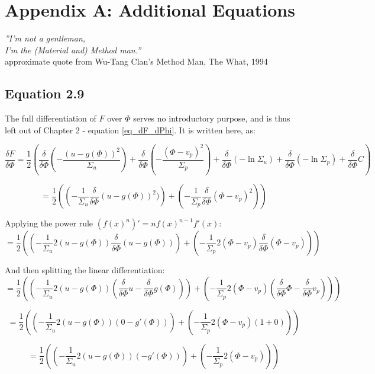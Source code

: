 \section{Appendix A: Additional Equations} 
\begin{flushright}
    \textit{''I'm not a gentleman,\\
    I'm the (Material and) Method man.''}\\
    approximate quote from Wu-Tang Clan's Method Man, The What, 1994
\end{flushright}
\label{appendix_maths}

\subsection{Equation 2.9}
The full differentiation of $F$ over $\Phi$ serves no introductory purpose, and is thus left out of Chapter 2 - equation \ref{eq_dF_dPhi}. It is written here, as: 

$$ \frac{\delta F}{\delta \Phi} = 
\frac{1}{2} \left(
\frac{\delta}{\delta \Phi}     \left(-\frac{(u - g(\Phi))^2}{\Sigma_u}\right) +
\frac{\delta}{\delta \Phi}     \left(-\frac{(\Phi - v_p)^2}{\Sigma_p}\right) + 
\frac{\delta}{\delta \Phi}      \left( -\ln\Sigma_u \right) + 
\frac{\delta}{\delta \Phi}      \left( -\ln\Sigma_p \right) + 
\frac{\delta}{\delta \Phi}      C
\right)
$$

$$ = 
\frac{1}{2} \left(
\left( -\frac{1}{\Sigma_u} \frac{\delta}{\delta \Phi} (u-g(\Phi))^2) \right) +
\left( -\frac{1}{\Sigma_p} \frac{\delta}{\delta \Phi} (\Phi-v_p)^2 \right)
\right)
$$

Applying the power rule $(f(x)^n)' = n f(x)^{n-1} f'(x)$:
$$ = 
\frac{1}{2} \left(
\left( -\frac{1}{\Sigma_u} 2(u-g(\Phi))\frac{\delta}{\delta \Phi} (u-g(\Phi)) \right) +
\left( -\frac{1}{\Sigma_p} 2(\Phi-v_p) \frac{\delta}{\delta \Phi} (\Phi-v_p) \right)
\right)
$$

And then splitting the linear differentiation:
$$ = 
\frac{1}{2} \left(
\left( -\frac{1}{\Sigma_u} 2(u-g(\Phi)) \left(\frac{\delta}{\delta \Phi} u - \frac{\delta}{\delta \Phi} g(\Phi)\right) \right) +
\left( -\frac{1}{\Sigma_p} 2(\Phi-v_p) \left(\frac{\delta}{\delta \Phi} \Phi - \frac{\delta}{\delta \Phi} v_p \right)\right)
\right)
$$

$$ = 
\frac{1}{2} \left(
\left( -\frac{1}{\Sigma_u} 2(u-g(\Phi)) \left(0 - g'(\Phi)\right) \right) +
\left( -\frac{1}{\Sigma_p} 2(\Phi-v_p) (1+0) \right)
\right)
$$

$$ = 
\frac{1}{2} \left(
\left( -\frac{1}{\Sigma_u} 2(u-g(\Phi))(-g'(\Phi)) \right) +
\left( -\frac{1}{\Sigma_p} 2(\Phi-v_p) \right)
\right)
$$

